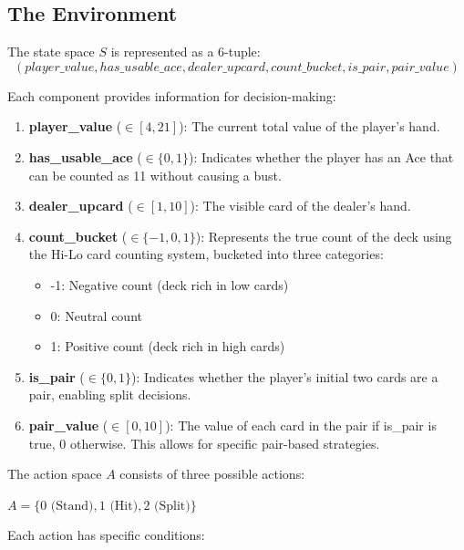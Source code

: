 \documentclass[10pt]{article}
\theoremstyle{definition}
\begin{document}
\subsection{The Environment}
The state space $S$ is represented as a 6-tuple:
\[(player\_value, has\_usable\_ace, dealer\_upcard, count\_bucket, is\_pair, pair\_value)\]

Each component provides information for decision-making:

\begin{enumerate}
    \item \textbf{player\_value} ($\in [4,21]$): The current total value of the player's hand. 
    \item \textbf{has\_usable\_ace} ($\in \{0,1\}$): Indicates whether the player has an Ace that can be counted as 11 without causing a bust. 
    \item \textbf{dealer\_upcard} ($\in [1,10]$): The visible card of the dealer's hand.
    \item \textbf{count\_bucket} ($\in \{-1,0,1\}$): Represents the true count of the deck using the Hi-Lo card counting system, bucketed into three categories:
    \begin{itemize}
        \item -1: Negative count (deck rich in low cards)
        \item 0: Neutral count
        \item 1: Positive count (deck rich in high cards)
    \end{itemize}
    \item \textbf{is\_pair} ($\in \{0,1\}$): Indicates whether the player's initial two cards are a pair, enabling split decisions.
    \item \textbf{pair\_value} ($\in [0,10]$): The value of each card in the pair if is\_pair is true, 0 otherwise. This allows for specific pair-based strategies.
\end{enumerate}
The action space $A$ consists of three possible actions:

\(A = \{0 \text{ (Stand)}, 1 \text{ (Hit)}, 2 \text{ (Split)}\}\)

Each action has specific conditions:
\end{document}
